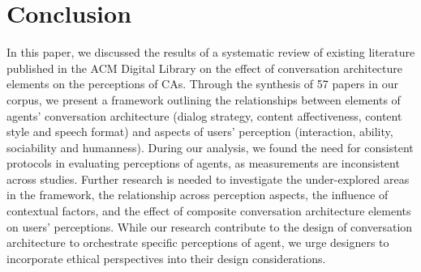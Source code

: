 
\section{Conclusion}

In this paper, we discussed the results of a systematic review of existing literature published in the ACM Digital Library on the effect of conversation architecture elements on the perceptions of CAs. Through the synthesis of 57 papers in our corpus, we present a framework outlining the relationships between elements of agents’ conversation architecture (dialog strategy, content affectiveness, content style and speech format) and aspects of users’ perception (interaction, ability, sociability and humanness). During our analysis, we found the need for consistent protocols in evaluating perceptions of agents, as measurements are inconsistent across studies. Further research is needed to investigate the under-explored areas in the framework, the relationship across perception aspects, the influence of contextual factors, and the effect of composite conversation architecture elements on users' perceptions. While our research contribute to the design of conversation architecture to orchestrate specific perceptions of agent, we urge designers to incorporate ethical perspectives into their design considerations.